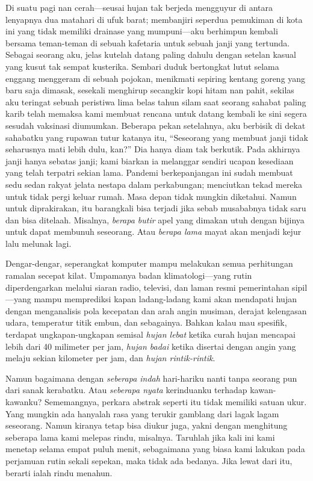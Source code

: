 \documentclass[smalldemyvopaper,11pt,twoside,onecolumn,openright,extrafontsizes]{memoir}
\begin{document}
Di suatu pagi nan cerah---seusai hujan tak berjeda mengguyur di antara lenyapnya dua matahari di ufuk barat; membanjiri seperdua pemukiman di kota ini yang tidak memiliki drainase yang mumpuni---aku berhimpun kembali bersama teman-teman di sebuah kafetaria untuk sebuah janji yang tertunda. Sebagai seorang aku, jelas kutelah datang paling dahulu dengan setelan kasual yang kusut tak sempat kusterika. Sembari duduk bertongkat lutut selama enggang menggeram di sebuah pojokan, menikmati sepiring kentang goreng yang baru saja dimasak, sesekali menghirup secangkir kopi hitam nan pahit, sekilas aku teringat sebuah peristiwa lima belas tahun silam saat seorang sahabat paling karib telah memaksa kami membuat rencana untuk datang kembali ke sini segera sesudah vaksinasi diumumkan. Beberapa pekan setelahnya, aku berbisik di dekat sahabatku yang rupawan tutur katanya itu, ``Seseorang yang membuat janji tidak seharusnya mati lebih dulu, kan?'' Dia hanya diam tak berkutik. Pada akhirnya janji hanya sebatas janji; kami biarkan ia melanggar sendiri ucapan kesediaan yang telah terpatri sekian lama. Pandemi berkepanjangan ini sudah membuat sedu sedan rakyat jelata nestapa dalam perkabungan; menciutkan tekad mereka untuk tidak pergi keluar rumah. Masa depan tidak mungkin diketahui. Namun untuk diprakirakan, itu barangkali bisa terjadi jika sebab musababnya tidak saru dan bisa ditelaah. Misalnya, \textit{berapa butir} apel yang dimakan utuh dengan bijinya untuk dapat membunuh seseorang. Atau \textit{berapa lama} mayat akan menjadi kejur lalu melunak lagi.


Dengar-dengar, seperangkat komputer mampu melakukan semua perhitungan ramalan secepat kilat. Umpamanya badan klimatologi---yang rutin diperdengarkan melalui siaran radio, televisi, dan laman resmi pemerintahan sipil---yang mampu memprediksi kapan ladang-ladang kami akan mendapati hujan dengan menganalisis pola kecepatan dan arah angin musiman, derajat kelengasan udara, temperatur titik embun, dan sebagainya. Bahkan kalau mau spesifik, terdapat ungkapan-ungkapan semisal \textit{hujan lebat} ketika curah hujan mencapai lebih dari 40 milimeter per jam, \textit{hujan badai} ketika disertai dengan angin yang melaju sekian kilometer per jam, dan \textit{hujan rintik-rintik}.


Namun bagaimana dengan \textit{seberapa indah} hari-hariku nanti tanpa seorang pun dari sanak kerabatku. Atau \textit{seberapa nyata} kerinduanku terhadap kawan-kawanku? Sememangnya, perkara abstrak seperti itu tidak memiliki satuan ukur. Yang mungkin ada hanyalah rasa yang terukir gamblang dari lagak lagam seseorang. Namun kiranya tetap bisa diukur juga, yakni dengan menghitung seberapa lama kami melepas rindu, misalnya. Taruhlah jika kali ini kami menetap selama empat puluh menit, sebagaimana yang biasa kami lakukan pada perjamuan rutin sekali sepekan, maka tidak ada bedanya. Jika lewat dari itu, berarti ialah rindu menahun.
\end{document}

